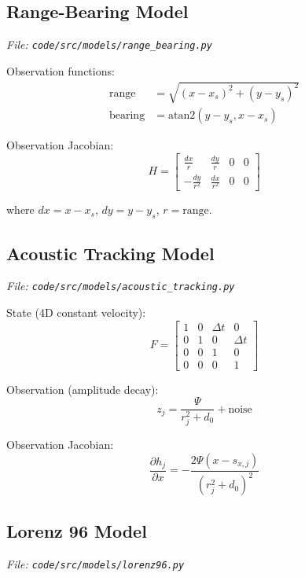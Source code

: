 \documentclass[12pt]{article}
\begin{document}
\subsection{Range-Bearing Model}
\textit{File: \texttt{code/src/models/range\_bearing.py}}

Observation functions:
\begin{align}
\text{range} &= \sqrt{(x - x_s)^2 + (y - y_s)^2} \\
\text{bearing} &= \text{atan2}(y - y_s, x - x_s)
\end{align}

Observation Jacobian:
\begin{equation}
H = \begin{bmatrix}
\frac{dx}{r} & \frac{dy}{r} & 0 & 0 \\
-\frac{dy}{r^2} & \frac{dx}{r^2} & 0 & 0
\end{bmatrix}
\end{equation}

where $dx = x - x_s$, $dy = y - y_s$, $r = \text{range}$.

\subsection{Acoustic Tracking Model}
\textit{File: \texttt{code/src/models/acoustic\_tracking.py}}

State (4D constant velocity):
\begin{equation}
F = \begin{bmatrix}
1 & 0 & \Delta t & 0 \\
0 & 1 & 0 & \Delta t \\
0 & 0 & 1 & 0 \\
0 & 0 & 0 & 1
\end{bmatrix}
\end{equation}

Observation (amplitude decay):
\begin{equation}
z_j = \frac{\Psi}{r_j^2 + d_0} + \text{noise}
\end{equation}

Observation Jacobian:
\begin{equation}
\frac{\partial h_j}{\partial x} = -\frac{2\Psi(x - s_{x,j})}{(r_j^2 + d_0)^2}
\end{equation}

\subsection{Lorenz 96 Model}
\textit{File: \texttt{code/src/models/lorenz96.py}}
\end{document}
